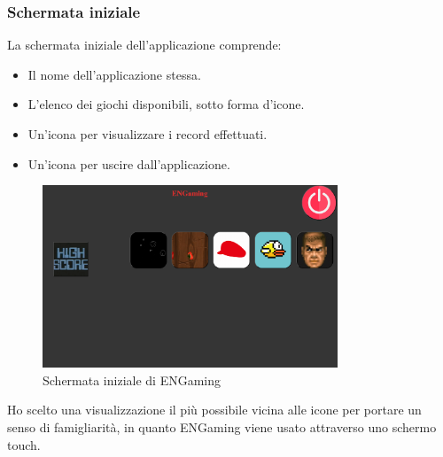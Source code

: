 \subsubsection{Schermata iniziale}
La schermata iniziale dell'applicazione comprende:
\begin{itemize}
    \item Il nome dell'applicazione stessa.
    \item L'elenco dei giochi disponibili, sotto forma d'icone.
    \item Un'icona per visualizzare i record effettuati.
    \item Un'icona per uscire dall'applicazione.
\end{itemize}
\begin{figure}[h]
    \centering
    \includegraphics[width=250pt]{images/product/schermataIniziale.png}
    \caption{Schermata iniziale di ENGaming}
    \label{fig:schermataIniziale}
\end{figure}
Ho scelto una visualizzazione il più possibile vicina alle icone per portare un senso di famigliarità, in quanto ENGaming viene usato attraverso uno schermo touch.
\newpage

